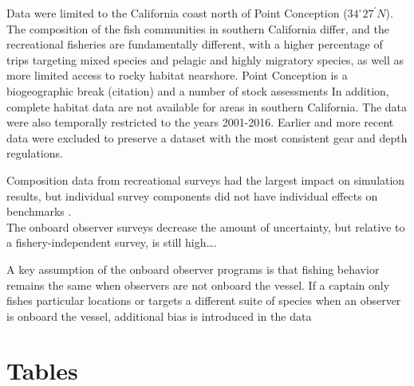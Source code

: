 \documentclass[
  authoryear,
  preprint,
  3p]{elsarticle}
\begin{document}
Data were limited to the California coast north of Point Conception
(\(34^\circ 27^\prime N\)). The composition of the fish communities in
southern California differ, and the recreational fisheries are
fundamentally different, with a higher percentage of trips targeting
mixed species and pelagic and highly migratory species, as well as more
limited access to rocky habitat nearshore. Point Conception is a
biogeographic break (citation) and a number of stock assessments In
addition, complete habitat data are not available for areas in southern
California. The data were also temporally restricted to the years
2001-2016. Earlier and more recent data were excluded to preserve a
dataset with the most consistent gear and depth regulations.

Composition data from recreational surveys had the largest impact on
simulation results, but individual survey components did not have
individual effects on benchmarks \citep{Siegfried:2016:ISA}.\\
The onboard observer surveys decrease the amount of uncertainty, but
relative to a fishery-independent survey, is still high\ldots.

A key assumption of the onboard observer programs is that fishing
behavior remains the same when observers are not onboard the vessel. If
a captain only fishes particular locations or targets a different suite
of species when an observer is onboard the vessel, additional bias is
introduced in the data

\FloatBarrier

\hypertarget{tables}{%
\section{Tables}\label{tables}}
\end{document}

